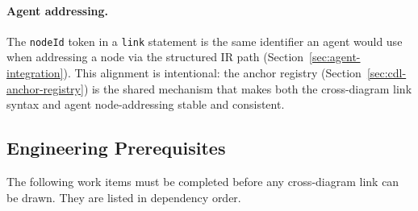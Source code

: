 \paragraph{Agent addressing.}

The \texttt{nodeId} token in a \texttt{link} statement is the same identifier
an agent would use when addressing a node via the structured IR path
(Section~\ref{sec:agent-integration}).  This alignment is intentional: the
anchor registry (Section~\ref{sec:cdl-anchor-registry}) is the shared
mechanism that makes both the cross-diagram link syntax and agent
node-addressing stable and consistent.

\subsection{Engineering Prerequisites}
\label{sec:cdl-prereqs}

The following work items must be completed before any cross-diagram link can
be drawn.  They are listed in dependency order.

